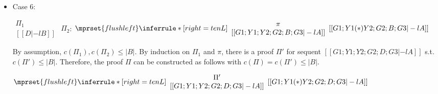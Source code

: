 \begin{itemize}
\item Case 6:
      \begin{center}
        \scriptsize
        \begin{math}
          \begin{array}{c}
            \Pi_1 \\
            {[[D |-l B]]}
          \end{array}
        \end{math}
        \qquad\qquad
        $\Pi_2$:
        \begin{math}
          $$\mprset{flushleft}
          \inferrule* [right={\tiny tenL}] {
            {
              \begin{array}{c}
                \pi \\
                {[[G1; Y1; Y2; G2; B; G3 |-l A]]}
              \end{array}
            }
          }{[[G1; Y1 (*) Y2; G2; B; G3 |-l A]]}
        \end{math}
      \end{center}
      By assumption, $c(\Pi_1),c(\Pi_2)\leq |B|$. By induction on $\Pi_1$
      and $\pi$, there is a proof $\Pi'$ for sequent
      $[[G1; Y1; Y2; G2; D; G3 |-l A]]$ s.t. $c(\Pi') \leq |B|$. Therefore,
      the proof $\Pi$ can be constructed as follows with
      $c(\Pi) = c(\Pi') \leq |B|$.
      \begin{center}
        \scriptsize
        \begin{math}
          $$\mprset{flushleft}
          \inferrule* [right={\tiny tenL}] {
            {
              \begin{array}{c}
                \Pi' \\
                {[[G1; Y1; Y2; G2; D; G3 |-l A]]}
              \end{array}
            }
          }{[[G1; Y1 (*) Y2; G2; D; G3 |-l A]]}
        \end{math}
      \end{center}
\end{itemize}


